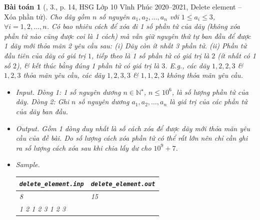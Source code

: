 \documentclass{article}
\newtheorem{baitoan}{Bài toán}
\begin{document}
\begin{baitoan}[\cite{Trung_HSG_THPT_Tin}, 3., p. 14, HSG Lớp 10 Vĩnh Phúc 2020--2021, Delete element -- Xóa phần tử]
	Cho dãy gồm $n$ số nguyên $a_1,a_2,\ldots,a_n$ với $1\le a_i\le3$, $\forall i = 1,2,\ldots,n$. Có bao nhiêu cách để xóa đi 1 số phần tử của dãy (không xóa phần tử nào cũng được coi là 1 cách) mà vẫn giữ nguyên thứ tự ban đầu để được 1 dãy mới thỏa mãn 2 yêu cầu sau: (i) Dãy còn ít nhất 3 phần  tử. (ii) Phần tử đầu tiên của dãy có giá trị $1$, tiếp theo là 1 số phần tử có giá trị là $2$ (ít nhất có 1 số $2$), \& kết thúc bằng đúng 1 phần tử có giá trị là $3$. E.g., các dãy $1,2,2,3$ \& $1,2,3$ thỏa mãn yêu cầu, các dãy $1,2,3,3$ \& $1,1,2,3$ không thỏa mãn yêu cầu.
	\begin{itemize}
		\item {\sf Input.} Dòng 1: 1 số nguyên dương $n\in\mathbb{N}^\star$, $n\le10^6$, là số lượng phần tử của dãy. Dòng 2: Ghi $n$ số nguyên dương $a_1,a_2,\ldots,a_n$ là giá trị của các phần tử của dãy ban đầu.
		\item {\sf Output.} Gồm 1 dòng duy nhất là số cách xóa để được dãy mới thỏa mãn yêu cầu của đề bài. Do số lượng cách xóa phần tử có thể rất lớn nên chỉ cần ghi ra số lượng cách xóa sau khi chia lấy dư cho $10^9 + 7$.
		\item {\sf Sample.}
		\begin{table}[H]
			\centering
			\begin{tabular}{|l|l|}
				\hline
				\verb|delete_element.inp| & \verb|delete_element.out| \\
				\hline
				8 & 15 \\
				1 2 1 2 3 1 2 3 &  \\
				\hline
			\end{tabular}
		\end{table}
	\end{itemize}
\end{baitoan}
\end{document}

